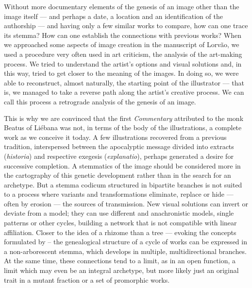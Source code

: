 \documentclass{article}
\begin{document}
Without more documentary elements of the genesis of an image other than
the image itself –– and perhaps a date, a location and an
identification of the authorship –– and having only a few similar works
to compare, how can one trace its stemma? How can one establish
the connections with previous works? When we approached some aspects of
image creation in the manuscript of Lorvão, we used a procedure very
often used in art criticism, the analysis of the art-making process. We
tried to understand the artist's options and visual solutions and, in
this way, tried to get closer to the meaning of the images. In doing so,
we were able to reconstruct, almost naturally, the starting point of the
illustrator –– that is, we managed to take a reverse path along the
artist's creative process. We can call this process a retrograde
analysis of the genesis of an image.

This is why we are convinced that the first \emph{Commentary} attributed
to the monk Beatus of Liébana was not, in terms of the body of the
illustrations, a complete work as we conceive it today. A few
illustrations recovered from a previous tradition, interspersed between
the apocalyptic message divided into extracts (\emph{historia}) and
respective exegesis (\emph{explanatio}), perhaps generated a desire for
successive completion. A stemmatics of the image should be considered
more in the cartography of this genetic development rather than in the
search for an archetype. But a stemma codicum structured in
bipartite branches is not suited to a process where variants and
transformations eliminate, replace or hide –– often by erosion –– the
sources of transmission. New visual solutions can invert or deviate from
a model; they can use different and anachronistic models, single
patterns or other cycles, building a network that is not compatible with
linear affiliation. Closer to the idea of a rhizome than a tree –– 
evoking the concepts formulated by \citet{deleuze_rhizome_1976} --
the genealogical structure of a cycle of works can be expressed in a
non-arborescent stemma, which develops in multiple,
multidirectional branches. At the same time, these connections tend to a
limit, as in an open function, a limit which may even be an integral
archetype, but more likely just an original trait in a mutant fraction
or a set of promorphic works.
\end{document}
